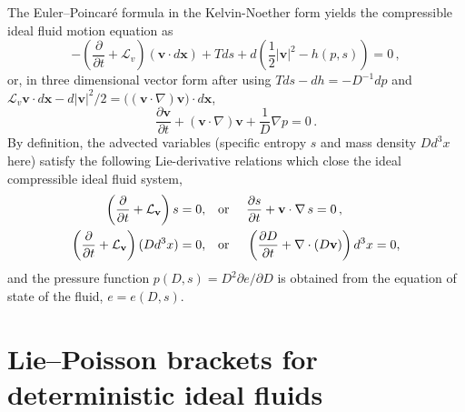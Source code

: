 \documentclass[11pt, oneside]{article}   	%
\numberwithin{equation}{section}
\theoremstyle{plain}
\theoremstyle{definition}
\theoremstyle{remark}
\newcommand{\<}{\langle}
\renewcommand{\>}{\rangle}
\begin{document}
The Euler--Poincar\'e formula in the Kelvin-Noether form
yields the compressible ideal fluid motion equation as
\begin{equation}
-\left(\frac{ \partial}{\partial t}+  \mathcal{L}_{v}\right)
\left({\mathbf{v}}\cdot d\mathbf{x}\right)
+ Tds
+ d\left(\frac{1}{2} |\mathbf{v}|^2 - h(p,s)\right) = 0\,,
\end{equation}
or, in three dimensional vector form after using $Tds - dh= - D^{-1}dp$ and 
$ \mathcal{L}_{v}{\mathbf{v}}\cdot d\mathbf{x}-d|\mathbf{v}|^2/2=\big((\mathbf{v}\cdot\nabla)\mathbf{v}\big)\cdot d\mathbf{x}$,
\begin{equation} 
\frac{ \partial\mathbf{v}}{\partial t} + (\mathbf{v}\cdot\nabla)\mathbf{v}
+\frac{ 1}{ D}\nabla p = 0\,.
\label{3DCcompressFlow}\end{equation}
By definition, the advected variables (specific entropy $s$ and mass density $Dd^3x$ here) satisfy 
the following Lie-derivative relations which close the ideal compressible ideal fluid 
system, 
\begin{align}
\begin{split}
\left(\frac{ \partial}{\partial t}+  \mathcal{L}_\mathbf{v}\right) s=0,
&\hbox{\quad or \quad}
\frac{ \partial s}{\partial t} + \mathbf{v}\cdot\nabla\,s = 0\,,
\\
\left(\frac{ \partial}{\partial t}+  \mathcal{L}_\mathbf{v}\right)(D d^3x)=0,
&\hbox{\quad or \quad}
\left(\frac{ \partial D}{\partial t} + \nabla\cdot(D\mathbf{v})\right)d^3x = 0,
\end{split}
\end{align}
and the pressure function $p(D,s) = D^2\partial e/\partial D$ is obtained from
the equation of state of the fluid, $e=e(D,s)$.
\smallskip


\section{Lie--Poisson brackets for deterministic ideal fluids}

\end{document}
